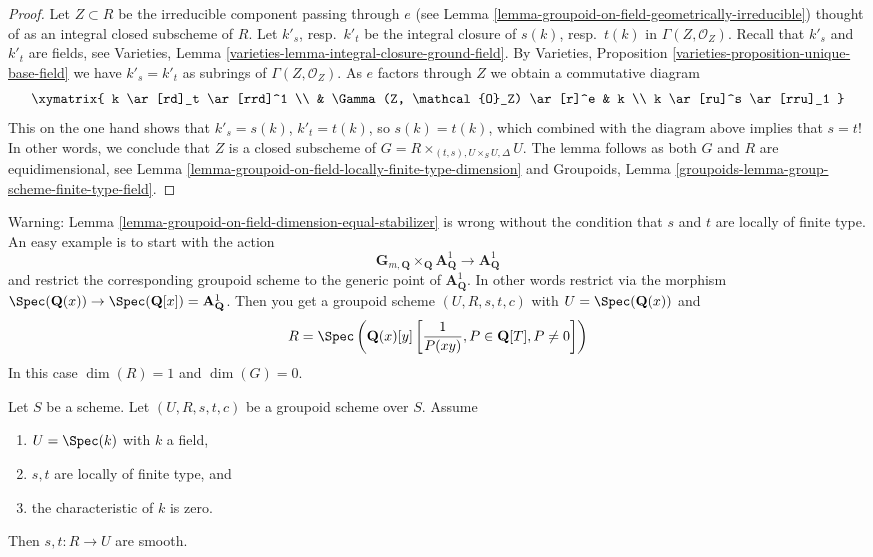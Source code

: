 \begin{proof}
Let $Z \subset R$ be the irreducible component passing through $e$ (see
Lemma \ref{lemma-groupoid-on-field-geometrically-irreducible})
thought of as an integral closed subscheme of $R$.
Let $k'_s$, resp.\ $k'_t$ be the integral closure of
$s(k)$, resp.\ $t(k)$ in $\Gamma(Z, \mathcal{O}_Z)$.
Recall that $k'_s$ and $k'_t$ are fields, see
Varieties, Lemma \ref{varieties-lemma-integral-closure-ground-field}.
By
Varieties, Proposition \ref{varieties-proposition-unique-base-field}
we have $k'_s = k'_t$ as subrings of $\Gamma(Z, \mathcal{O}_Z)$.
As $e$ factors through $Z$ we obtain a commutative diagram
$$
\xymatrix{
k \ar[rd]_t \ar[rrd]^1 \\
& \Gamma(Z, \mathcal{O}_Z) \ar[r]^e & k \\
k \ar[ru]^s \ar[rru]_1
}
$$
This on the one hand shows that $k'_s = s(k)$, $k'_t = t(k)$, so
$s(k) = t(k)$, which combined with the diagram above implies
that $s = t$! In other words, we conclude that $Z$ is a closed
subscheme of $G = R \times_{(t, s), U \times_S U, \Delta} U$.
The lemma follows as both $G$ and $R$ are equidimensional, see
Lemma \ref{lemma-groupoid-on-field-locally-finite-type-dimension} and
Groupoids, Lemma \ref{groupoids-lemma-group-scheme-finite-type-field}.
\end{proof}

\begin{remark}
\label{remark-warn-dimension-groupoid-on-field}
Warning:
Lemma \ref{lemma-groupoid-on-field-dimension-equal-stabilizer}
is wrong without the condition that $s$ and $t$ are locally of
finite type.
An easy example is to start with the action
$$
\mathbf{G}_{m, \mathbf{Q}} \times_{\mathbf{Q}} \mathbf{A}^1_{\mathbf{Q}}
\to \mathbf{A}^1_{\mathbf{Q}}
$$
and restrict the corresponding groupoid scheme to the generic point of
$\mathbf{A}^1_{\mathbf{Q}}$. In other words restrict via the morphism
$\Spec(\mathbf{Q}(x)) \to
\Spec(\mathbf{Q}[x]) = \mathbf{A}^1_{\mathbf{Q}}$.
Then you get a groupoid scheme
$(U, R, s, t, c)$ with
$U = \Spec(\mathbf{Q}(x))$
and
$$
R = \Spec\left(
\mathbf{Q}(x)[y]\left[
\frac{1}{P(xy)}, P \in \mathbf{Q}[T], P \not = 0
\right]
\right)
$$
In this case $\dim(R) = 1$ and $\dim(G) = 0$.
\end{remark}

\begin{lemma}
\label{lemma-groupoid-characteristic-zero-smooth}
Let $S$ be a scheme. Let $(U, R, s, t, c)$ be a groupoid scheme
over $S$. Assume
\begin{enumerate}
\item $U = \Spec(k)$ with $k$ a field,
\item $s, t$ are locally of finite type, and
\item the characteristic of $k$ is zero.
\end{enumerate}
Then $s, t : R \to U$ are smooth.
\end{lemma}

